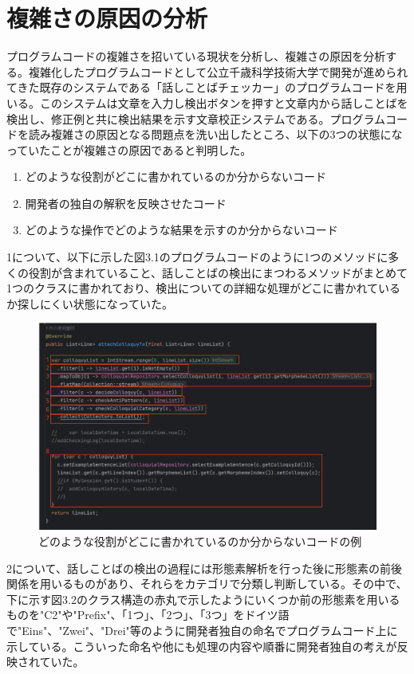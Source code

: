 \documentclass[11pt, a4paper]{jreport}
\begin{document}
\section{複雑さの原因の分析}
プログラムコードの複雑さを招いている現状を分析し、複雑さの原因を分析する。複雑化したプログラムコードとして公立千歳科学技術大学で開発が進められてきた既存のシステムである「話しことばチェッカー」のプログラムコードを用いる。このシステムは文章を入力し検出ボタンを押すと文章内から話しことばを検出し、修正例と共に検出結果を示す文章校正システムである。プログラムコードを読み複雑さの原因となる問題点を洗い出したところ、以下の3つの状態になっていたことが複雑さの原因であると判明した。
\begin{enumerate}
\item どのような役割がどこに書かれているのか分からないコード
\item 開発者の独自の解釈を反映させたコード
\item どのような操作でどのような結果を示すのか分からないコード
\end{enumerate}
1について、以下に示した図3.1のプログラムコードのように1つのメソッドに多くの役割が含まれていること、話しことばの検出にまつわるメソッドがまとめて1つのクラスに書かれており、検出についての詳細な処理がどこに書かれているか探しにくい状態になっていた。
\begin{figure}[H]
\centering \includegraphics[width=1\linewidth]{image/genin1.1.png}
\caption{どのような役割がどこに書かれているのか分からないコードの例}
\label{fig:enter-label}
\end{figure}
2について、話しことばの検出の過程には形態素解析を行った後に形態素の前後関係を用いるものがあり、それらをカテゴリで分類し判断している。その中で、下に示す図3.2のクラス構造の赤丸で示したようにいくつか前の形態素を用いるものを"C2"や"Prefix"、「1つ」、「2つ」、「3つ」をドイツ語で"Eins"、"Zwei"、"Drei"等のように開発者独自の命名でプログラムコード上に示している。こういった命名や他にも処理の内容や順番に開発者独自の考えが反映されていた。
\end{document}
